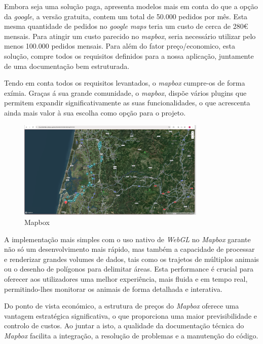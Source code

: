 Embora seja uma solução paga, apresenta modelos mais em conta do que a opção da \textit{google}, a versão gratuita, contem um total de 50.000 pedidos por mês. Esta mesma quantidade de pedidos no \textit{google maps} teria um custo de cerca de 280€ mensais. Para atingir um custo parecido no \textit{mapbox}, seria necessário utilizar pelo menos 100.000 pedidos mensais. Para além do fator preço/economico, esta solução, compre todos os requisitos definidos para a nossa aplicação, juntamente de uma documentação bem estruturada.

Tendo em conta todos os requisitos levantados, o \textit{mapbox} cumpre-os de forma exímia. Graças á sua grande comunidade, o \textit{mapbox}, dispõe vários plugins que permitem expandir significativamente as suas funcionalidades, o que acrescenta ainda mais valor à sua escolha como opção para o projeto.

\begin{figure}[h!]
    \centering
    \includegraphics[width=0.8\textwidth]{figs/mapbox.png}
    \caption[Mapbox]{Mapbox}
    \label{fig:mapbox}
\end{figure}

A implementação mais simples com o uso nativo de \textit{WebGL} no \textit{Mapbox} garante não só um desenvolvimento mais rápido, mas também a capacidade de processar e renderizar grandes volumes de dados, tais como os trajetos de múltiplos animais ou o desenho de polígonos para delimitar áreas. Esta performance é crucial para oferecer aos utilizadores uma melhor experiência, mais fluida e em tempo real, permitindo-lhes monitorar os animais de forma detalhada e interativa.

Do ponto de vista económico, a estrutura de preços do \textit{Mapbox} oferece uma vantagem estratégica significativa, o que proporciona uma maior previsibilidade e controlo de custos. Ao juntar a isto, a qualidade da documentação técnica do \textit{Mapbox} facilita a integração, a resolução de problemas e a manutenção do código.


